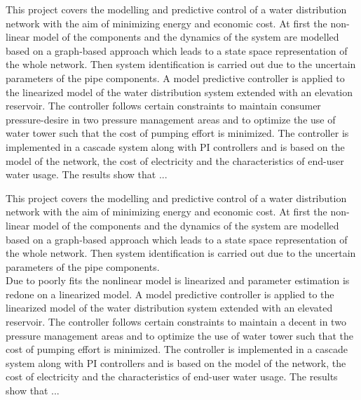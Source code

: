 This project covers the modelling and predictive control of a water distribution network with the aim of minimizing energy and economic cost. 
\newline
At first the non-linear model of the components and the dynamics of the system are modelled based on a graph-based approach which leads to a state space representation of the whole network. Then system identification is carried out due to the uncertain parameters of the pipe components.
\newline
A model predictive controller is applied to the linearized model of the water distribution system extended with an elevation reservoir. The controller follows certain constraints to maintain consumer pressure-desire in two pressure management areas and to optimize the use of water tower such that the cost of pumping effort is minimized. 
The controller is implemented in a cascade system along with PI controllers and is based on the model of the network, the cost of electricity and the characteristics of end-user water usage. 
\newline
The results show that ...









This project covers the modelling and predictive control of a water distribution network with the aim of minimizing energy and economic cost. 
\newline
At first the non-linear model of the components and the dynamics of the system are modelled based on a graph-based approach which leads to a state space representation of the whole network. Then system identification is carried out due to the uncertain parameters of the pipe components.\\
Due to poorly fits the nonlinear model is linearized and parameter estimation is redone on a linearized model.
\newline
A model predictive controller is applied to the linearized model of the water distribution system extended with an elevated reservoir. The controller follows certain constraints to maintain a decent in two pressure management areas and to optimize the use of water tower such that the cost of pumping effort is minimized. 
The controller is implemented in a cascade system along with PI controllers and is based on the model of the network, the cost of electricity and the characteristics of end-user water usage. 
\newline
The results show that ...